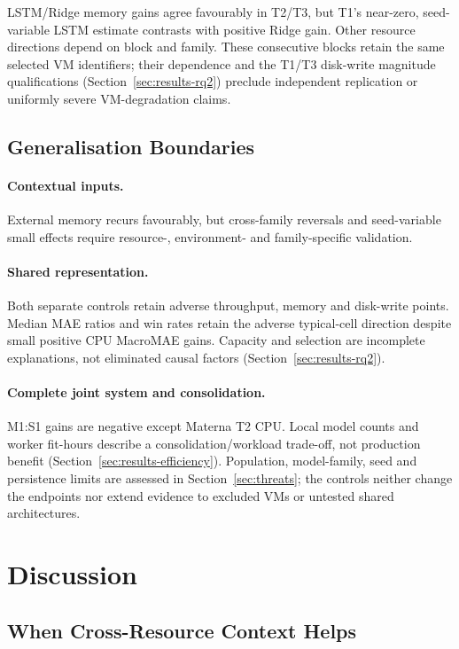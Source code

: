 \documentclass[a4paper,fleqn]{cas-dc}
\begin{document}
LSTM/Ridge memory gains agree favourably in T2/T3, but T1's near-zero,
seed-variable LSTM estimate contrasts with positive Ridge gain. Other resource
directions depend on block and family. These consecutive blocks retain the
same selected VM identifiers; their dependence and the T1/T3 disk-write
magnitude qualifications (Section~\ref{sec:results-rq2}) preclude independent
replication or uniformly severe VM-degradation claims.

\subsection{Generalisation Boundaries}

\paragraph{Contextual inputs.}
External memory recurs favourably, but cross-family reversals and seed-variable
small effects require resource-, environment- and family-specific validation.

\paragraph{Shared representation.}
Both separate controls retain adverse throughput, memory and disk-write
points. Median MAE ratios and win rates retain the adverse typical-cell
direction despite small positive CPU MacroMAE gains. Capacity and selection
are incomplete explanations, not eliminated causal factors
(Section~\ref{sec:results-rq2}).

\paragraph{Complete joint system and consolidation.}
M1:S1 gains are negative except Materna T2 CPU. Local model counts and worker
fit-hours describe a consolidation/workload trade-off, not production benefit
(Section~\ref{sec:results-efficiency}). Population, model-family, seed and
persistence limits are assessed in Section~\ref{sec:threats}; the controls
neither change the endpoints nor extend evidence to excluded VMs or untested
shared architectures.

\section{Discussion}
\label{sec:discussion}

\subsection{When Cross-Resource Context Helps}
\label{sec:discussion-context}
\end{document}

